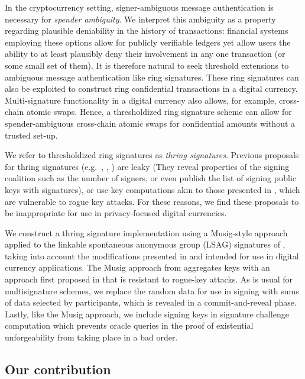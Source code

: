 \documentclass{iacrtrans}
\theoremstyle{definition}
\numberwithin{theorem}{subsection}
\numberwithin{lemma}{theorem}
\begin{document}
In the cryptocurrency setting, signer-ambiguous message authentication is necessary for \textit{spender ambiguity}. We interpret this ambiguity as a property regarding plausible deniability in the history of transactions: financial systems employing these options allow for publicly verifiable ledgers yet allow users the ability to at least plausibly deny their involvement in any one transaction (or some small set of them). It is therefore natural to seek threshold extensions to ambiguous message authentication like ring signatures. These ring signatures can also be exploited to construct ring confidential transactions in a digital currency. Multi-signature functionality in a digital currency also allows, for example, cross-chain atomic swaps. Hence, a thresholdized ring signature scheme can allow for spender-ambiguous cross-chain atomic swaps for confidential amounts without a trusted set-up.

We refer to thresholdized ring signatures as \textit{thring signatures}. Previous proposals for thring signatures (e.g.\ \cite{bresson2002threshold}, \cite{liu2003separable}, \cite{tsang2004separable}) are leaky (They reveal properties of the signing coalition such as the number of signers, or even publish the list of signing public keys with signatures), or use key computations akin to those presented in \cite{bellare2006multi}, which are vulnerable to rogue key attacks. For these reasons, we find these proposals to be inappropriate for use in privacy-focused digital currencies.

We construct a thring signature implementation using a Musig-style approach applied to the linkable spontaneous anonymous group (LSAG) signatures of \cite{liu2004linkable}, taking into account the modifications presented in \cite{backLSAG} and \cite{noether2016ring} intended for use in digital currency applications. The Musig approach from \cite{maxwell2018simple} aggregates keys with an approach first proposed in \cite{qian2010non} that is resistant to rogue-key attacks. As is usual for multisignature schemes, we replace the random data for use in signing with sums of data selected by participants, which is revealed in a commit-and-reveal phase. Lastly, like the Musig approach, we include signing keys in signature challenge computation which prevents oracle queries in the proof of existential unforgeability from taking place in a bad order. 


\subsection{Our contribution}
\end{document}
